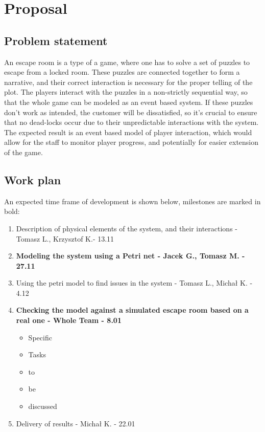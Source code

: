 
\chapter{Proposal}
\section{Problem statement}
An escape room is a type of a game, where one has to solve a set of puzzles to escape from a locked room.
These puzzles are connected together to form a narrative, and their correct interaction is necessary for the proper telling of the plot. The players interact with the puzzles in a non-strictly sequential way, so that the whole game can be modeled as an event based system. If these puzzles don't work as intended, the customer will be dissatisfied, so it's crucial to ensure that no dead-locks occur due to their unpredictable interactions with the system. The expected result is an event based model of player interaction, which would allow for the staff to monitor player progress, and potentially for easier extension of the game.
\section{Work plan}
An expected time frame of development is shown below, milestones are marked in bold:
\begin{enumerate}
        \item Description of physical elements of the system, and their interactions - Tomasz L., Krzysztof K.- 13.11
        \item \textbf{Modeling the system using a Petri net - Jacek G., Tomasz M. - 27.11}
        \item Using the petri model to find issues in the system - Tomasz L., Michał K. - 4.12
        \item \textbf{Checking the model against a simulated escape room based on a real one - Whole Team - 8.01} 
            \begin{itemize}
                \item Specific
                \item Tasks
                \item to
                \item be
                \item discussed
            \end{itemize}
        \item Delivery of results - Michał K. - 22.01
\end{enumerate}




